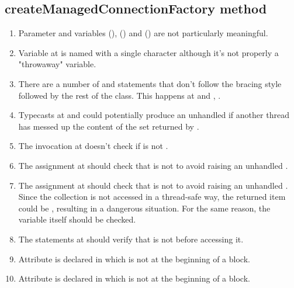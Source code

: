 \subsection{createManagedConnectionFactory method}
\begin{enumerate}
	\item {} Parameter  and variables (), () and () are not particularly meaningful. 
	\item {} Variable  at  is named with a single character although it's not properly a "throwaway" variable. 
	\item {} There are a number of  and  statements that don't follow the bracing style followed by the rest of the class. This happens at  and , .
	\item {} Typecasts at  and  could potentially produce an unhandled  if another thread has messed up the content of the set returned by .
	\item {} The invocation  at  doesn't check if  is not .
	\item {} The assignment  at  should check that  is not  to avoid raising an unhandled . 
	\item {} The assignment  at  should check that  is not  to avoid raising an unhandled . Since the collection is not accessed in a thread-safe way, the returned item could be , resulting in a dangerous situation. For the same reason, the  variable itself should be checked. 
	\item {} The  statements at  should verify that  is not  before accessing it. 
	\item {} Attribute  is declared in  which is not at the beginning of a block. 
	\item {} Attribute  is declared in  which is not at the beginning of a block.

\end{enumerate}
